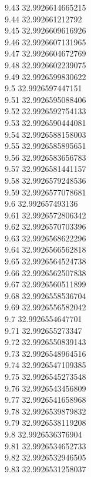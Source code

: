 {9.43	32.9926614665215\\
9.44	32.992661212792\\
9.45	32.9926609616926\\
9.46	32.9926607131965\\
9.47	32.9926604672769\\
9.48	32.9926602239075\\
9.49	32.9926599830622\\
9.5	32.9926597447151\\
9.51	32.9926595088406\\
9.52	32.9926592754133\\
9.53	32.9926590444081\\
9.54	32.9926588158003\\
9.55	32.9926585895651\\
9.56	32.9926583656783\\
9.57	32.9926581441157\\
9.58	32.9926579248536\\
9.59	32.9926577078681\\
9.6	32.992657493136\\
9.61	32.9926572806342\\
9.62	32.9926570703396\\
9.63	32.9926568622296\\
9.64	32.9926566562818\\
9.65	32.9926564524738\\
9.66	32.9926562507838\\
9.67	32.9926560511899\\
9.68	32.9926558536704\\
9.69	32.9926556582042\\
9.7	32.9926554647701\\
9.71	32.992655273347\\
9.72	32.9926550839143\\
9.73	32.9926548964516\\
9.74	32.9926547109385\\
9.75	32.9926545273548\\
9.76	32.9926543456809\\
9.77	32.9926541658968\\
9.78	32.9926539879832\\
9.79	32.9926538119208\\
9.8	32.9926536376904\\
9.81	32.9926534652733\\
9.82	32.9926532946505\\
9.83	32.9926531258037\\
}
